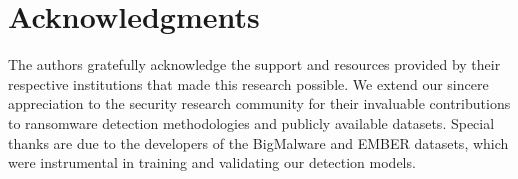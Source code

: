 \documentclass[pdflatex,sn-mathphys-num]{sn-jnl}%
\begin{document}

\maketitle























\section*{Acknowledgments}
The authors gratefully acknowledge the support and resources provided by their respective institutions that made this research possible. We extend our sincere appreciation to the security research community for their invaluable contributions to ransomware detection methodologies and publicly available datasets. Special thanks are due to the developers of the BigMalware and EMBER datasets, which were instrumental in training and validating our detection models.



\end{document}
